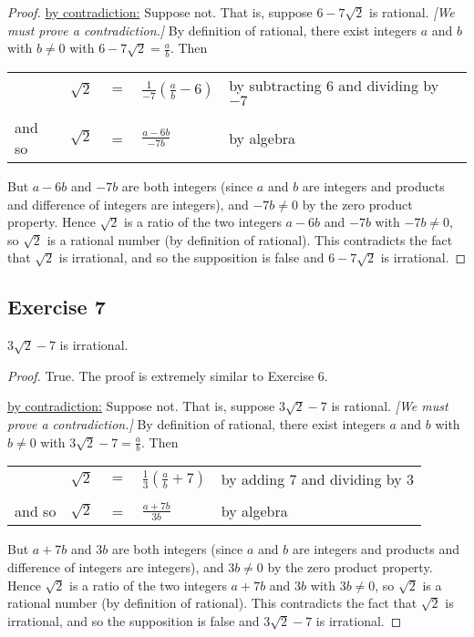 \documentclass[14pt]{extarticle}
\newcommand{\dps}{\displaystyle}
\newcommand{\cy}{\color{cyan}}
\begin{document}
\begin{proof}
\underline{by contradiction:} Suppose not. That is, suppose
$6 - 7\sqrt{2}$ is rational. {\it [We must prove a contradiction.]} By definition of rational, there exist integers $a$ and $b$ with $b \neq 0$ with $6 - 7\sqrt{2} = \frac{a}{b}$. Then

\begin{center}
\begin{tabular}{lrcll}
& $\sqrt{2}$ & $=$ & $\dps\frac{1}{-7}\left(\frac{a}{b} - 6\right) $ & {\cy by subtracting 6 and dividing by $-7$} \\
\\
and so & $\sqrt{2}$ & = & $\dps\frac{a-6b}{-7b}$ & {\cy by algebra}\\
\end{tabular}
\end{center}

But $a - 6b$ and $-7b$ are both integers (since $a$ and $b$ are integers and products and difference of integers are integers), and $-7b \neq 0$ by the zero product property. Hence $\sqrt{2}$ is a ratio of the two integers $a - 6b$ and $-7b$ with $-7b \neq 0$, so $\sqrt{2}$ is a rational number (by definition of rational). This contradicts the fact that $\sqrt{2}$ is irrational, and so the supposition is false and $6 - 7 \sqrt{2}$ is irrational.
\end{proof}

\subsection{Exercise 7}
$3\sqrt{2} - 7$ is irrational.

\begin{proof}
True. The proof is extremely similar to Exercise 6. 

\underline{by contradiction:} Suppose not. That is, suppose
$3\sqrt{2} - 7$ is rational. {\it [We must prove a contradiction.]} By definition of rational, there exist integers $a$ and $b$ with $b \neq 0$ with $3\sqrt{2} - 7 = \frac{a}{b}$. Then

\begin{center}
\begin{tabular}{lrcll}
& $\sqrt{2}$ & $=$ & $\dps\frac{1}{3}\left(\frac{a}{b} + 7\right) $ & {\cy by adding 7 and dividing by 3} \\
\\
and so & $\sqrt{2}$ & = & $\dps\frac{a+7b}{3b}$ & {\cy by algebra}\\
\end{tabular}
\end{center}

But $a + 7b$ and $3b$ are both integers (since $a$ and $b$ are integers and products and difference of integers are integers), and $3b \neq 0$ by the zero product property. Hence $\sqrt{2}$ is a ratio of the two integers $a + 7b$ and $3b$ with $3b \neq 0$, so $\sqrt{2}$ is a rational number (by definition of rational). This contradicts the fact that $\sqrt{2}$ is irrational, and so the supposition is false and $3\sqrt{2} - 7$ is irrational.
\end{proof}
\end{document}
